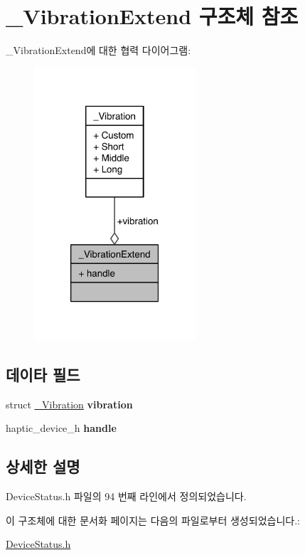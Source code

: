 \hypertarget{struct___vibration_extend}{\section{\-\_\-\-Vibration\-Extend 구조체 참조}
\label{struct___vibration_extend}
}


\-\_\-\-Vibration\-Extend에 대한 협력 다이어그램\-:\nopagebreak
\begin{figure}[H]
\begin{center}
\leavevmode
\includegraphics[width=171pt]{struct___vibration_extend__coll__graph}
\end{center}
\end{figure}
\subsection*{데이타 필드}
\begin{DoxyCompactItemize}
\item 
\hypertarget{struct___vibration_extend_a6bedb19d846a3c685c14dad4e54e7fec}{struct \hyperlink{struct___vibration}{\-\_\-\-Vibration} {\bfseries vibration}}\label{struct___vibration_extend_a6bedb19d846a3c685c14dad4e54e7fec}

\item 
\hypertarget{struct___vibration_extend_a9351c6f63eb6cddee6a469192fd36abf}{haptic\-\_\-device\-\_\-h {\bfseries handle}}\label{struct___vibration_extend_a9351c6f63eb6cddee6a469192fd36abf}

\end{DoxyCompactItemize}


\subsection{상세한 설명}


Device\-Status.\-h 파일의 94 번째 라인에서 정의되었습니다.



이 구조체에 대한 문서화 페이지는 다음의 파일로부터 생성되었습니다.\-:\begin{DoxyCompactItemize}
\item 
\hyperlink{_device_status_8h}{Device\-Status.\-h}\end{DoxyCompactItemize}

